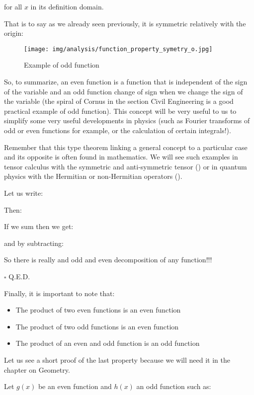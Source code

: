 \begin{enumerate}
		for all $x$ in its definition domain.
		
		That is to say as we already seen previously, it is symmetric relatively with the origin:
		\begin{figure}[H]
			\centering	\texttt{[image: img/analysis/function\_property\_symetry\_o.jpg]}
			\caption{Example of odd function}
		\end{figure}
		So, to summarize, an even function is a function that is independent of the sign of the variable and an odd function change of sign when we change the sign of the variable (the spiral of Cornus in the section Civil Engineering is a good practical example of odd function). This concept will be very useful to us to simplify some very useful developments in physics (such as Fourier transforms of odd or even functions for example, or the calculation of certain integrals!).
		\begin{theorem}
		Remember that this type theorem linking a general concept to a particular case and its opposite is often found in mathematics. We will see such examples in tensor calculus with the symmetric and anti-symmetric tensor () or in quantum physics with the Hermitian or non-Hermitian operators ().
		\end{theorem}
		\begin{dem}
		Let us write:
		
		Then:
		
		If we sum then we get:
		
		and by subtracting:
		
		So there is really and odd and even decomposition of any function!!!
		\begin{flushright}
			$\square$  Q.E.D.
		\end{flushright}
		\end{dem}
		Finally, it is important to note that:
		\begin{itemize}
			\item The product of two even functions is an even function
			\item The product of two odd functions is an even function
			\item The product of an even and odd function is an odd function
		\end{itemize}
		Let us see a short proof of the last property because we will need it in the chapter on Geometry.
		\begin{dem}
		Let $g(x)$ be an even function and $h(x)$ an odd function such as:
		

\end{dem}
\end{enumerate}
